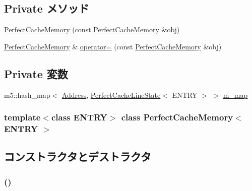 \subsection*{Private メソッド}
\begin{DoxyCompactItemize}
\item 
\hyperlink{classPerfectCacheMemory_a3bdf2c56b3085371e93f3669780fa026}{PerfectCacheMemory} (const \hyperlink{classPerfectCacheMemory}{PerfectCacheMemory} \&obj)
\item 
\hyperlink{classPerfectCacheMemory}{PerfectCacheMemory} \& \hyperlink{classPerfectCacheMemory_af0ee374fdedca801f79f2dc482ad0e62}{operator=} (const \hyperlink{classPerfectCacheMemory}{PerfectCacheMemory} \&obj)
\end{DoxyCompactItemize}
\subsection*{Private 変数}
\begin{DoxyCompactItemize}
\item 
m5::hash\_\-map$<$ \hyperlink{classAddress}{Address}, \hyperlink{structPerfectCacheLineState}{PerfectCacheLineState}$<$ ENTRY $>$ $>$ \hyperlink{classPerfectCacheMemory_a9c43d7a42d7d83abf0d764a1de886104}{m\_\-map}
\end{DoxyCompactItemize}
\subsubsection*{template$<$class ENTRY$>$ class PerfectCacheMemory$<$ ENTRY $>$}



\subsection{コンストラクタとデストラクタ}
\hypertarget{classPerfectCacheMemory_a8eb5b11992aff833dd207d5b281aecd4}{
\subsubsection[{PerfectCacheMemory}]{ ()}}
\label{classPerfectCacheMemory_a8eb5b11992aff833dd207d5b281aecd4}




